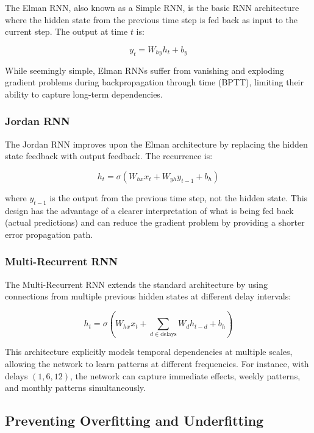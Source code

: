 \documentclass[conference]{IEEEtran}
\begin{document}
The Elman RNN, also known as a Simple RNN, is the basic RNN architecture
where the hidden state from the previous time step is fed back as input
to the current step. The output at time $t$ is:

\begin{equation}
y_t = W_{hy}h_t + b_y
\end{equation}

While seemingly simple, Elman RNNs suffer from vanishing and exploding
gradient problems during backpropagation through time (BPTT), limiting
their ability to capture long-term dependencies.

\subsubsection{Jordan RNN}

The Jordan RNN improves upon the Elman architecture by replacing the
hidden state feedback with output feedback. The recurrence is:

\begin{equation}
h_t = \sigma(W_{hx}x_t + W_{yh}y_{t-1} + b_h)
\end{equation}

where $y_{t-1}$ is the output from the previous time step, not the hidden
state. This design has the advantage of a clearer interpretation of
what is being fed back (actual predictions) and can reduce the gradient
problem by providing a shorter error propagation path.

\subsubsection{Multi-Recurrent RNN}

The Multi-Recurrent RNN extends the standard architecture by using
connections from multiple previous hidden states at different delay intervals:

\begin{equation}
h_t =
\sigma\left(
W_{hx}x_t +
\sum_{d \in \text{delays}} W_d h_{t-d} +
b_h
\right)
\end{equation}

This architecture explicitly models temporal dependencies at multiple
scales, allowing the network to learn patterns at different frequencies.
For instance, with delays $(1,6,12)$, the network can capture immediate effects,
weekly patterns, and monthly patterns simultaneously.
\\
\subsection{Preventing Overfitting and Underfitting}
\end{document}

